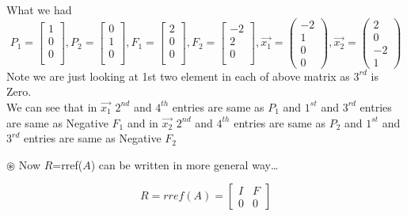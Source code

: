 \documentclass[a4paper,11pt]{article}
\numberwithin{equation}{section}
\begin{document}
\begin{itemize}
\begin{center}
    What we had
    \[  P_1=
        \begin{bmatrix}
            1\\0\\0\\
        \end{bmatrix},
        P_2=
        \begin{bmatrix}
            0\\1\\0\\
        \end{bmatrix},
        F_1=
        \begin{bmatrix}
            2\\0\\0\\
        \end{bmatrix},
        F_2=
        \begin{bmatrix}
            -2\\2\\0\\
        \end{bmatrix},
        \vec{x_1}=
        \begin{pmatrix}
            -2\\1\\0\\0
        \end{pmatrix},
        \vec{x_2}=
        \begin{pmatrix}
            2\\0\\-2\\1
        \end{pmatrix}
    \]
    Note we are just looking at 1st two element in each of above matrix as $3^{rd}$ is Zero.\\
    We can see that in $\vec{x_1}$ $2^{nd}$ and $4^{th}$ entries are same as $P_1$ and $1^{st}$ and $3^{rd}$ entries are same as Negative $F_1$ and in $\vec{x_2}$ $2^{nd}$ and $4^{th}$ entries are same as $P_2$ and $1^{st}$ and $3^{rd}$ entries are same as Negative $F_2$\\
\end{center}

\textbf{$\circledast$ }Now $R$=rref($A$) can be written in more general way\dots

\begin{equation}
    R=rref(A)=
    \begin{bmatrix}
        I&F\\0&0
    \end{bmatrix}
\end{equation}


\end{itemize}
\end{document}
